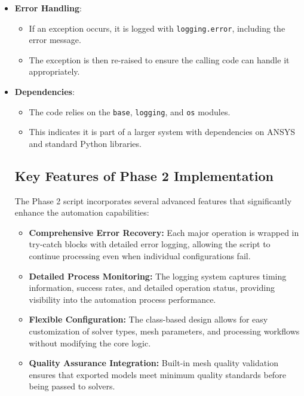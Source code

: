 \documentclass{book}
\begin{document}
\begin{itemize}[leftmargin=*,label=\textbullet]
\begin{itemize}
    \item \textbf{Error Handling}:
    \begin{itemize}
        \item If an exception occurs, it is logged with \texttt{logging.error}, including the error message.
        \item The exception is then re-raised to ensure the calling code can handle it appropriately.
    \end{itemize}
    \item \textbf{Dependencies}:
    \begin{itemize}
        \item The code relies on the \texttt{base}, \texttt{logging}, and \texttt{os} modules.
        \item This indicates it is part of a larger system with dependencies on ANSYS and standard Python libraries.
    \end{itemize}



\subsection{Key Features of Phase 2 Implementation}

The Phase 2 script incorporates several advanced features that significantly enhance the automation capabilities:

\begin{itemize}[leftmargin=*,label=\textbullet]
    \item \textbf{Comprehensive Error Recovery:} Each major operation is wrapped in try-catch blocks with detailed error logging, allowing the script to continue processing even when individual configurations fail.
    
    \item \textbf{Detailed Process Monitoring:} The logging system captures timing information, success rates, and detailed operation status, providing visibility into the automation process performance.
    
    \item \textbf{Flexible Configuration:} The class-based design allows for easy customization of solver types, mesh parameters, and processing workflows without modifying the core logic.
    
    \item \textbf{Quality Assurance Integration:} Built-in mesh quality validation ensures that exported models meet minimum quality standards before being passed to solvers.
    

\end{itemize}
\end{itemize}
\end{itemize}
\end{document}
